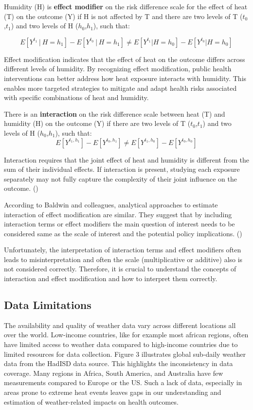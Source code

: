 \documentclass[
]{krantz}
\begin{document}
Humidity (H) is \textbf{effect modifier} on the risk difference scale for the effect of heat (T) on the outcome (Y) if H is not affected by T and there are two levels of T (\(t_0\),\(t_1\)) and two levels of H (\(h_0\),\(h_1\)), such that:

\[
Ε[Y^{t_1}│H=h_1] - E[Y^{t_0}│H=h_1] ≠ E[Y^{t_1}|H=h_0]- E[Y^{t_0}|H=h_0]
\]

Effect modification indicates that the effect of heat on the outcome differs across different levels of humidity. By recognizing effect modification, public health interventions can better address how heat exposure interacts with humidity. This enables more targeted strategies to mitigate and adapt health risks associated with specific combinations of heat and humidity.

There is an \textbf{interaction} on the risk difference scale between heat (T) and humidity (H) on the outcome (Y) if there are two levels of T (\(t_0\),\(t_1\)) and two levels of H (\(h_0\),\(h_1\)), such that:
\[
Ε[Y^{t_1, h_1}] - E[Y^{t_0, h_1}] ≠ E[Y^{t_1, h_0}]- E[Y^{t_0, h_0}]
\]

Interaction requires that the joint effect of heat and humidity is different from the sum of their individual effects. If interaction is present, studying each exposure separately may not fully capture the complexity of their joint influence on the outcome. (\citet{vanderweele2009})

According to Baldwin and colleagues, analytical approaches to estimate interaction of effect modification are similar. They suggest that by including interaction terms or effect modifiers the main question of interest needs to be considered same as the scale of interest and the potential policy implications. (\citet{baldwin2023})

Unfortunately, the interpretation of interaction terms and effect modifiers often leads to misinterpretation and often the scale (multiplicative or additive) also is not considered correctly. Therefore, it is crucial to understand the concepts of interaction and effect modification and how to interpret them correctly.

\subsection{Data Limitations}\label{data-limitations}

The availability and quality of weather data vary across different locations all over the world. Low-income countries, like for example most african regions, often have limited access to weather data compared to high-income countries due to limited resources for data collection. Figure 3 illustrates global sub-daily weather data from the HadISD data source. This highlights the inconsistency in data coverage. Many regions in Africa, South America, and Australia have few measurements compared to Europe or the US. Such a lack of data, especially in areas prone to extreme heat events leaves gaps in our understanding and estimation of weather-related impacts on health outcomes.
\end{document}
